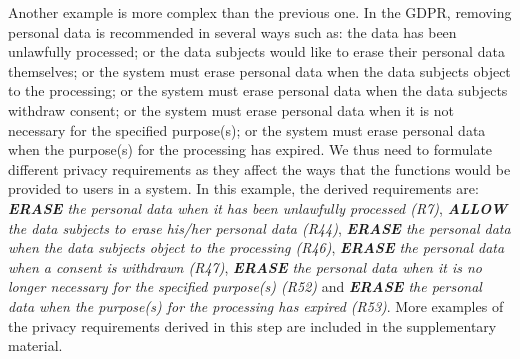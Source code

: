 Another example is more complex than the previous one. In the GDPR, removing personal data is recommended in several ways such as: the data has been unlawfully processed; or the data subjects would like to erase their personal data themselves; or the system must erase personal data when the data subjects object to the processing; or the system must erase personal data when the data subjects withdraw consent; or the system must erase personal data when it is not necessary for the specified purpose(s); or the system must erase personal data when the purpose(s) for the processing has expired. We thus need to formulate different privacy requirements as they affect the ways that the functions would be provided to users in a system. In this example, the derived requirements are: \textit{\textbf{ERASE} the personal data when it has been unlawfully processed (R7)}, \textit{\textbf{ALLOW} the data subjects to erase his/her personal data (R44)}, \textit{\textbf{ERASE} the personal data when the data subjects object to the processing (R46)}, \textit{\textbf{ERASE} the personal data when a consent is withdrawn (R47)}, \textit{\textbf{ERASE} the personal data when it is no longer necessary for the specified purpose(s) (R52)} and \textit{\textbf{ERASE} the personal data when the purpose(s) for the processing has expired (R53)}. More examples of the privacy requirements derived in this step are included in the supplementary material.

